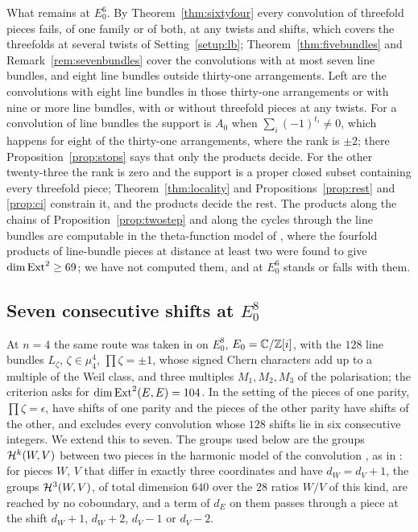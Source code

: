 What remains at $E_{0}^{6}$. By Theorem~\ref{thm:sixtyfour} every convolution of threefold pieces fails, of one family or of both, at any twists and shifts, which covers the threefolds at several twists of Setting~\ref{setup:lb}; Theorem~\ref{thm:fivebundles} and Remark~\ref{rem:sevenbundles} cover the convolutions with at most seven line bundles, and eight line bundles outside thirty-one arrangements. Left are the convolutions with eight line bundles in those thirty-one arrangements or with nine or more line bundles, with or without threefold pieces at any twists. For a convolution of line bundles the support is $A_{0}$ when $\sum_{i}(-1)^{t_{i}}\ne0$, which happens for eight of the thirty-one arrangements, where the rank is $\pm2$; there Proposition~\ref{prop:stops} says that only the products decide. For the other twenty-three the rank is zero and the support is a proper closed subset containing every threefold piece; Theorem~\ref{thm:locality} and Propositions~\ref{prop:rest} and \ref{prop:ci} constrain it, and the products decide the rest. The products along the chains of Proposition~\ref{prop:twostep} and along the cycles through the line bundles are computable in the theta-function model of \cite[\S18]{BMB26}, where the fourfold products of line-bundle pieces at distance at least two were found to give $\dim\mathrm{Ext}^{2}\ge69$; we have not computed them, and \Fii{} at $E_{0}^{6}$ stands or falls with them.

\subsection{\texorpdfstring{Seven consecutive shifts at $E_{0}^{8}$}{Seven consecutive shifts at E0 to the 8}}\label{ssec:efourseven}

At $n=4$ the same route was taken in \cite[\S18]{BMB26} on $E_{0}^{8}$, $E_{0}=\mathbb{C}/\mathbb{Z}[i]$, with the $128$ line bundles $L_{\zeta}$, $\zeta\in\mu_{4}^{4}$, $\prod\zeta=\pm1$, whose signed Chern characters add up to a multiple of the Weil class, and three multiples $M_{1},M_{2},M_{3}$ of the polarisation; the criterion asks for $\dim\mathrm{Ext}^{2}(E,E)=104$. In the setting of \cite[Lemma~18.36]{BMB26} the pieces of one parity, $\prod\zeta=\epsilon$, have shifts of one parity and the pieces of the other parity have shifts of the other, and \cite[Cor.~18.48]{BMB26} excludes every convolution whose $128$ shifts lie in six consecutive integers. We extend this to seven. The groups used below are the groups $\mathcal{H}^{k}(W,V)$ between two pieces in the harmonic model of the convolution \cite[Lemma~18.24]{BMB26}, as in \cite[Thm.~18.37 and Lemma~18.39]{BMB26}: for pieces $W$, $V$ that differ in exactly three coordinates and have $d_{W}=d_{V}+1$, the groups $\mathcal{H}^{3}(W,V)$, of total dimension $640$ over the $28$ ratios $W/V$ of this kind, are reached by no coboundary, and a term of $d_{E}$ on them passes through a piece at the shift $d_{W}+1$, $d_{W}+2$, $d_{V}-1$ or $d_{V}-2$.

